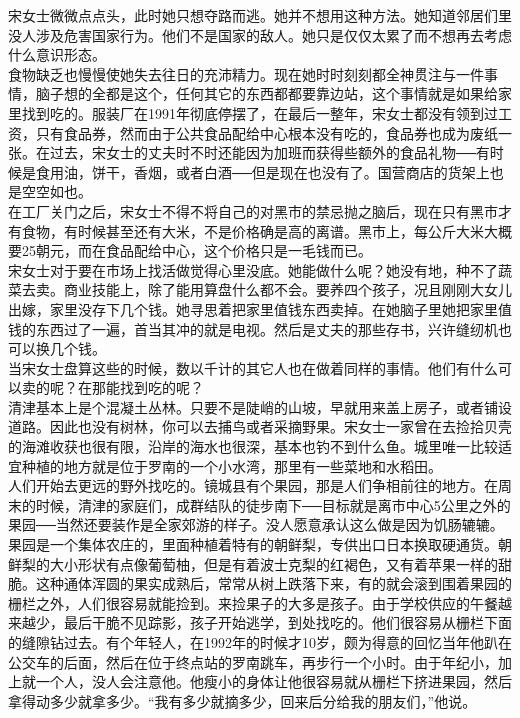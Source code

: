 宋女士微微点点头，此时她只想夺路而逃。她并不想用这种方法。她知道邻居们里没人涉及危害国家行为。他们不是国家的敌人。她只是仅仅太累了而不想再去考虑什么意识形态。\\

食物缺乏也慢慢使她失去往日的充沛精力。现在她时时刻刻都全神贯注与一件事情，脑子想的全都是这个，任何其它的东西都都要靠边站，这个事情就是如果给家里找到吃的。服装厂在1991年彻底停摆了，在最后一整年，宋女士都没有领到过工资，只有食品券，然而由于公共食品配给中心根本没有吃的，食品券也成为废纸一张。在过去，宋女士的丈夫时不时还能因为加班而获得些额外的食品礼物──有时候是食用油，饼干，香烟，或者白酒──但是现在也没有了。国营商店的货架上也是空空如也。\\

在工厂关门之后，宋女士不得不将自己的对黑市的禁忌抛之脑后，现在只有黑市才有食物，有时候甚至还有大米，不是价格确是高的离谱。黑市上，每公斤大米大概要25朝元，而在食品配给中心，这个价格只是一毛钱而已。\\

宋女士对于要在市场上找活做觉得心里没底。她能做什么呢？她没有地，种不了蔬菜去卖。商业技能上，除了能用算盘什么都不会。要养四个孩子，况且刚刚大女儿出嫁，家里没存下几个钱。她寻思着把家里值钱东西卖掉。在她脑子里她把家里值钱的东西过了一遍，首当其冲的就是电视。然后是丈夫的那些存书，兴许缝纫机也可以换几个钱。\\

当宋女士盘算这些的时候，数以千计的其它人也在做着同样的事情。他们有什么可以卖的呢？在那能找到吃的呢？\\

清津基本上是个混凝土丛林。只要不是陡峭的山坡，早就用来盖上房子，或者铺设道路。因此也没有树林，你可以去捕鸟或者采摘野果。宋女士一家曾在去捡拾贝壳的海滩收获也很有限，沿岸的海水也很深，基本也钓不到什么鱼。城里唯一比较适宜种植的地方就是位于罗南的一个小水湾，那里有一些菜地和水稻田。\\

人们开始去更远的野外找吃的。镜城县有个果园，那是人们争相前往的地方。在周末的时候，清津的家庭们，成群结队的徒步南下──目标就是离市中心5公里之外的果园──当然还要装作是全家郊游的样子。没人愿意承认这么做是因为饥肠辘辘。果园是一个集体农庄的，里面种植着特有的朝鲜梨，专供出口日本换取硬通货。朝鲜梨的大小形状有点像葡萄柚，但是有着波士克梨的红褐色，又有着苹果一样的甜脆。这种通体浑圆的果实成熟后，常常从树上跌落下来，有的就会滚到围着果园的栅栏之外，人们很容易就能捡到。来捡果子的大多是孩子。由于学校供应的午餐越来越少，最后干脆不见踪影，孩子开始逃学，到处找吃的。他们很容易从栅栏下面的缝隙钻过去。有个年轻人，在1992年的时候才10岁，颇为得意的回忆当年他趴在公交车的后面，然后在位于终点站的罗南跳车，再步行一个小时。由于年纪小，加上就一个人，没人会注意他。他瘦小的身体让他很容易就从栅栏下挤进果园，然后拿得动多少就拿多少。“我有多少就摘多少，回来后分给我的朋友们，”他说。\\


